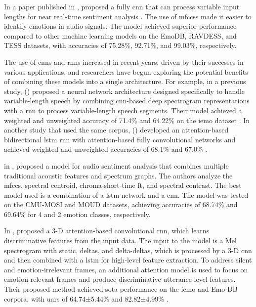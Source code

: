 In a paper published in \citeyear{GARCIAORDAS2021102946}, \citeauthor{GARCIAORDAS2021102946} proposed a fully \ac{cnn} that can process variable input lengths for near real-time sentiment analysis \cite{GARCIAORDAS2021102946}. The use of \acp{mfccs} made it easier to identify emotions in audio signals. The model achieved superior performance compared to other machine learning models on the EmoDB, RAVDESS, and TESS datasets, with accuracies of 75.28\%, 92.71\%, and 99.03\%, respectively.

The use of \acp{cnn} and \acp{rnn} increased in recent years, driven by their successes in various applications, and researchers have begun exploring the potential benefits of combining these models into a single architecture. For example, in a previous study, \citeauthor{ma18b_interspeech} (\citeyear{ma18b_interspeech}) proposed a neural network architecture designed specifically to handle variable-length speech by combining \ac{cnn}-based deep spectrogram representations with a \ac{rnn} to process variable-length speech segments. Their model achieved a weighted and unweighted accuracy of 71.4\% and 64.22\% on the \ac{iemo} dataset \cite{ma18b_interspeech}. In another study that used the same corpus, \citeauthor{Zhao2019} (\citeyear{Zhao2019}) developed an attention-based bidirectional \ac{lstm} \ac{rnn} with attention-based fully convolutional networks and achieved weighted and unweighted accuracies of 68.1\% and 67.0\% \cite{Zhao2019}.

\citeauthor{Luo2018} in \citeyear{Luo2018}, proposed a model for audio sentiment analysis that combines multiple traditional acoustic features and spectrum graphs. The authors analyze the \ac{mfccs}, spectral centroid, chroma-short-time \ac{ft}, and spectral contrast. The best model used is a combination of a \ac{lstm} network and a \ac{cnn}. The model was tested on the CMU-MOSI and MOUD datasets, achieving accuracies of 68.74\% and 69.64\% for 4 and 2 emotion classes, respectively.

In \citeyear{8421023}, \citeauthor{8421023} proposed a 3-D attention-based convolutional \ac{rnn}, which learns discriminative features from the input data. The input to the model is a Mel spectrogram with static, deltas, and delta-deltas, which is processed by a 3-D \ac{cnn} and then combined with a \ac{lstm} for high-level feature extraction. To address silent and emotion-irrelevant frames, an additional attention model is used to focus on emotion-relevant frames and produce discriminative utterance-level features. Their proposed method achieved \ac{sota} performance on the \ac{iemo} and Emo-DB corpora, with \acp{uar} of 64.74±5.44\% and 82.82±4.99\% \cite{8421023}.

